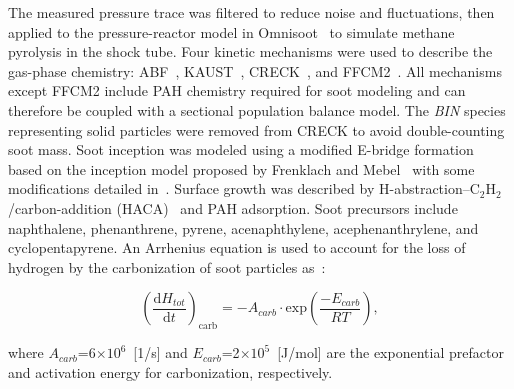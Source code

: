 The measured pressure trace was filtered to reduce noise and fluctuations, then applied to the pressure-reactor model in Omnisoot~\citep{adib2026omnisoot} to simulate methane pyrolysis in the shock tube. Four kinetic mechanisms were used to describe the gas-phase chemistry: ABF~\citep{appel2000kinetic}, KAUST~\citep{wang2013pah}, CRECK~\citep{pejpichestakul2019examination}, and FFCM2~\citep{ZDV2023}. All mechanisms except FFCM2 include PAH chemistry required for soot modeling and can therefore be coupled with a sectional population balance model. The \textit{BIN} species representing solid particles were removed from CRECK to avoid double-counting soot mass. Soot inception was modeled using a modified E-bridge formation based on the inception model proposed by Frenklach and Mebel~\citep{frenklach2020mechanism} with some modifications detailed in~\citep{adib2026omnisoot}. Surface growth was described by H-abstraction–C$_2$H$_2$/carbon-addition (HACA)~\citep{appel2000kinetic} and PAH adsorption. Soot precursors include naphthalene, phenanthrene, pyrene, acenaphthylene, acephenanthrylene, and cyclopentapyrene. An Arrhenius equation is used to account for the loss of hydrogen by the carbonization of soot particles as~\citep{basile2002coagulation}:

\begin{equation}
	\left(\frac{\mathrm{d}H_{tot}}{\mathrm{d}t}\right)_{\mathrm{carb}}=
	-A_{carb}\cdot \mathrm{exp}(\frac{-E_{carb}}{RT}),
	\label{eqn:kads_ebir}
\end{equation}

\noindent where $A_{carb}$=6$\times10^6$~[1/s] and $E_{carb}$=2$\times10^5$~[J/mol] are the exponential prefactor and activation energy for carbonization, respectively.